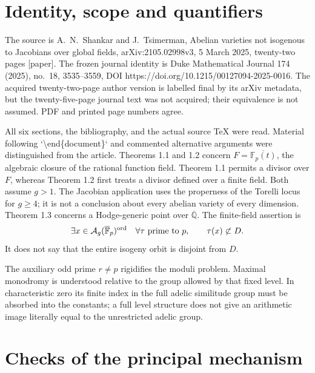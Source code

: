 \documentclass[10pt]{article}
\begin{document}
\section*{Identity, scope and quantifiers}
The source is A. N. Shankar and J. Tsimerman, Abelian varieties not isogenous to Jacobians over global fields, arXiv:2105.02998v3, 5 March 2025, twenty-two pages [paper]. The frozen journal identity is Duke Mathematical Journal 174 (2025), no. 18, 3535–3559, DOI https://doi.org/10.1215/00127094-2025-0016. The acquired twenty-two-page author version is labelled final by its arXiv metadata, but the twenty-five-page journal text was not acquired; their equivalence is not assumed. PDF and printed page numbers agree.\par
All six sections, the bibliography, and the actual source TeX were read. Material following `\textbackslash{}end\{document\}` and commented alternative arguments were distinguished from the article. Theorems 1.1 and 1.2 concern \(F=\overline{\mathbb F_p(t)}\), the algebraic closure of the rational function field. Theorem 1.1 permits a divisor over \(F\), whereas Theorem 1.2 first treats a divisor defined over a finite field. Both assume \(g>1\). The Jacobian application uses the properness of the Torelli locus for \(g\geq4\); it is not a conclusion about every abelian variety of every dimension. Theorem 1.3 concerns a Hodge-generic point over \(\overline{\mathbb Q}\). The finite-field assertion is \[\exists x\in\mathcal A_g(\overline{\mathbb F}_p)^{\rm ord}\quad
  \forall \tau\text{ prime to }p,\qquad \tau(x)\not\subset D .\] It does not say that the entire isogeny orbit is disjoint from \(D\).\par
The auxiliary odd prime \(r\ne p\) rigidifies the moduli problem. Maximal monodromy is understood relative to the group allowed by that fixed level. In characteristic zero its finite index in the full adelic similitude group must be absorbed into the constants; a full level structure does not give an arithmetic image literally equal to the unrestricted adelic group.\par
\section*{Checks of the principal mechanism}
\end{document}
